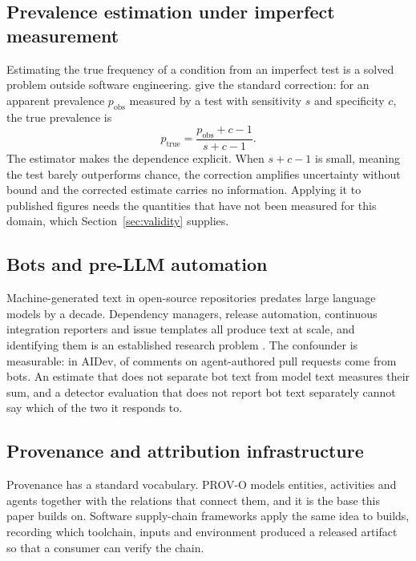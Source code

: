\subsection{Prevalence estimation under imperfect measurement}
\label{sec:background:correction}

Estimating the true frequency of a condition from an imperfect test is a solved problem
outside software engineering. \citet{rogan1978estimating} give the standard correction:
for an apparent prevalence $p_{\text{obs}}$ measured by a test with sensitivity $s$ and
specificity $c$, the true prevalence is
\begin{equation}
  p_{\text{true}} = \frac{p_{\text{obs}} + c - 1}{s + c - 1}.
  \label{eq:rogan-gladen}
\end{equation}
The estimator makes the dependence explicit. When $s + c - 1$ is small, meaning the test
barely outperforms chance, the correction amplifies uncertainty without bound and the
corrected estimate carries no information. Applying it to published figures needs the
quantities that have not been measured for this domain, which
Section~\ref{sec:validity} supplies.

\subsection{Bots and pre-LLM automation}
\label{sec:background:bots}

Machine-generated text in open-source repositories predates large language models by a
decade. Dependency managers, release automation, continuous integration reporters and
issue templates all produce text at scale, and identifying them is an established
research problem \citep{golzadeh2021bodegha}. The confounder is measurable: in
AIDev, \AidevCommentBotShare{} of comments on agent-authored pull requests come from
bots. An estimate that does not separate bot text from model text measures their sum,
and a detector evaluation that does not report bot text separately cannot say which of
the two it responds to.

\subsection{Provenance and attribution infrastructure}
\label{sec:background:provenance}

Provenance has a standard vocabulary. PROV-O \citep{lebo2013provo} models entities,
activities and agents together with the relations that connect them, and it is the base
this paper builds on. Software supply-chain frameworks apply the same idea to builds,
recording which toolchain, inputs and environment produced a released artifact so that a
consumer can verify the chain.

